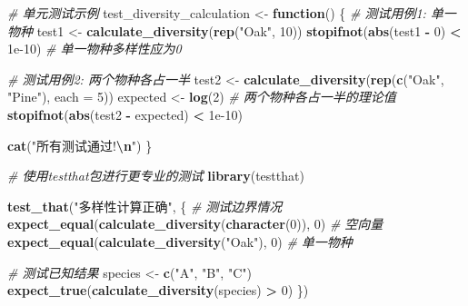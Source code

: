 \documentclass[
]{book}
\newenvironment{Shaded}{\begin{snugshade}}{\end{snugshade}}
\newcommand{\AttributeTok}[1]{\textcolor[rgb]{0.13,0.29,0.53}{#1}}
\newcommand{\CommentTok}[1]{\textcolor[rgb]{0.56,0.35,0.01}{\textit{#1}}}
\newcommand{\ControlFlowTok}[1]{\textcolor[rgb]{0.13,0.29,0.53}{\textbf{#1}}}
\newcommand{\DecValTok}[1]{\textcolor[rgb]{0.00,0.00,0.81}{#1}}
\newcommand{\FloatTok}[1]{\textcolor[rgb]{0.00,0.00,0.81}{#1}}
\newcommand{\FunctionTok}[1]{\textcolor[rgb]{0.13,0.29,0.53}{\textbf{#1}}}
\newcommand{\NormalTok}[1]{#1}
\newcommand{\OtherTok}[1]{\textcolor[rgb]{0.56,0.35,0.01}{#1}}
\newcommand{\SpecialCharTok}[1]{\textcolor[rgb]{0.81,0.36,0.00}{\textbf{#1}}}
\newcommand{\StringTok}[1]{\textcolor[rgb]{0.31,0.60,0.02}{#1}}
\begin{document}
\begin{Shaded}
\begin{Highlighting}[]
\CommentTok{\# 单元测试示例}
\NormalTok{test\_diversity\_calculation }\OtherTok{\textless{}{-}} \ControlFlowTok{function}\NormalTok{() \{}
  \CommentTok{\# 测试用例1: 单一物种}
\NormalTok{  test1 }\OtherTok{\textless{}{-}} \FunctionTok{calculate\_diversity}\NormalTok{(}\FunctionTok{rep}\NormalTok{(}\StringTok{"Oak"}\NormalTok{, }\DecValTok{10}\NormalTok{))}
  \FunctionTok{stopifnot}\NormalTok{(}\FunctionTok{abs}\NormalTok{(test1 }\SpecialCharTok{{-}} \DecValTok{0}\NormalTok{) }\SpecialCharTok{\textless{}} \FloatTok{1e{-}10}\NormalTok{)  }\CommentTok{\# 单一物种多样性应为0}

  \CommentTok{\# 测试用例2: 两个物种各占一半}
\NormalTok{  test2 }\OtherTok{\textless{}{-}} \FunctionTok{calculate\_diversity}\NormalTok{(}\FunctionTok{rep}\NormalTok{(}\FunctionTok{c}\NormalTok{(}\StringTok{"Oak"}\NormalTok{, }\StringTok{"Pine"}\NormalTok{), }\AttributeTok{each =} \DecValTok{5}\NormalTok{))}
\NormalTok{  expected }\OtherTok{\textless{}{-}} \FunctionTok{log}\NormalTok{(}\DecValTok{2}\NormalTok{)  }\CommentTok{\# 两个物种各占一半的理论值}
  \FunctionTok{stopifnot}\NormalTok{(}\FunctionTok{abs}\NormalTok{(test2 }\SpecialCharTok{{-}}\NormalTok{ expected) }\SpecialCharTok{\textless{}} \FloatTok{1e{-}10}\NormalTok{)}

  \FunctionTok{cat}\NormalTok{(}\StringTok{"所有测试通过!}\SpecialCharTok{\textbackslash{}n}\StringTok{"}\NormalTok{)}
\NormalTok{\}}

\CommentTok{\# 使用testthat包进行更专业的测试}
\FunctionTok{library}\NormalTok{(testthat)}

\FunctionTok{test\_that}\NormalTok{(}\StringTok{"多样性计算正确"}\NormalTok{, \{}
  \CommentTok{\# 测试边界情况}
  \FunctionTok{expect\_equal}\NormalTok{(}\FunctionTok{calculate\_diversity}\NormalTok{(}\FunctionTok{character}\NormalTok{(}\DecValTok{0}\NormalTok{)), }\DecValTok{0}\NormalTok{)  }\CommentTok{\# 空向量}
  \FunctionTok{expect\_equal}\NormalTok{(}\FunctionTok{calculate\_diversity}\NormalTok{(}\StringTok{"Oak"}\NormalTok{), }\DecValTok{0}\NormalTok{)  }\CommentTok{\# 单一物种}

  \CommentTok{\# 测试已知结果}
\NormalTok{  species }\OtherTok{\textless{}{-}} \FunctionTok{c}\NormalTok{(}\StringTok{"A"}\NormalTok{, }\StringTok{"B"}\NormalTok{, }\StringTok{"C"}\NormalTok{)}
  \FunctionTok{expect\_true}\NormalTok{(}\FunctionTok{calculate\_diversity}\NormalTok{(species) }\SpecialCharTok{\textgreater{}} \DecValTok{0}\NormalTok{)}
\NormalTok{\})}


\end{Highlighting}
\end{Shaded}
\end{document}
